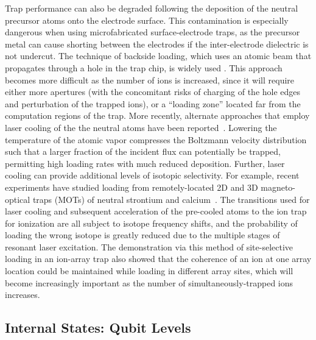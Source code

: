 \documentclass[%
12pt,
 amsmath,amssymb,
]{revtex4-2}
\begin{document}
Trap performance can also be degraded following the deposition of the neutral precursor atoms onto the electrode surface. This contamination is especially dangerous when using microfabricated surface-electrode traps, as the precursor metal can cause shorting between the electrodes if the inter-electrode dielectric is not undercut. The technique of backside loading, which uses an atomic beam that propagates through a hole in the trap chip, is widely used \cite{NIST:Bksideloading:APL:09,stick2010demonstration,merrill2011demonstration}. This approach becomes more difficult as the number of ions is increased, since it will require either more apertures (with the concomitant risks of charging of the hole edges and perturbation of the trapped ions), or a ``loading zone'' located far from the computation regions of the trap. More recently, alternate approaches that employ laser cooling of the the neutral atoms have been reported~\cite{cetina2007bright,sage2012loading,BruzewiczArrayLoading2016}. Lowering the temperature of the atomic vapor compresses the Boltzmann velocity distribution such that a larger fraction of the incident flux can potentially be trapped, permitting high loading rates with much reduced deposition. Further, laser cooling can provide additional levels of isotopic selectivity. For example, recent experiments have studied loading from remotely-located 2D and 3D magneto-optical traps (MOTs) of neutral strontium and calcium~\cite{sage2012loading,BruzewiczArrayLoading2016,BruzewiczQLAR2017}. The transitions used for laser cooling and subsequent acceleration of the pre-cooled atoms to the ion trap for ionization are all subject to isotope frequency shifts, and the probability of loading the wrong isotope is greatly reduced due to the multiple stages of resonant laser excitation. The demonstration via this method of site-selective loading in an ion-array trap \cite{BruzewiczArrayLoading2016} also showed that the coherence of an ion at one array location could be maintained while loading in different array sites, which will become increasingly important as the number of simultaneously-trapped ions increases.

\subsection{Internal States:  Qubit Levels}
\label{subInternal}
\end{document}
